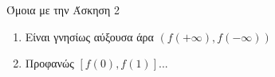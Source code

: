 \documentclass{presentation}
\begin{document}
\begin{lisi}
  Όμοια με την Άσκηση 2

  \hyperlink{Άσκηση5}{}
\end{lisi}

\begin{lisi}
  \begin{enumerate}
    \item Είναι γνησίως αύξουσα άρα $(f(+\infty),f(-\infty))$
    \item Προφανώς $[f(0),f(1)]$...
  \end{enumerate}

  \hyperlink{Άσκηση6}{}
\end{lisi}

\moodle
\end{document}
